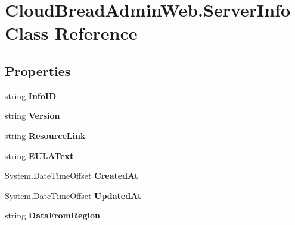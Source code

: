 \hypertarget{a00178}{}\section{Cloud\+Bread\+Admin\+Web.\+Server\+Info Class Reference}
\label{a00178}
\subsection*{Properties}
\begin{DoxyCompactItemize}
\item 
string {\bfseries Info\+ID}\hypertarget{a00178_accdcdfc1ab4e23514b0f8f4c015e8373}{}\label{a00178_accdcdfc1ab4e23514b0f8f4c015e8373}

\item 
string {\bfseries Version}\hypertarget{a00178_ad57bcb8012a019e9b0215ae4ece28b0b}{}\label{a00178_ad57bcb8012a019e9b0215ae4ece28b0b}

\item 
string {\bfseries Resource\+Link}\hypertarget{a00178_ad7a6b91f540b9af762f3ad8f5b28a93e}{}\label{a00178_ad7a6b91f540b9af762f3ad8f5b28a93e}

\item 
string {\bfseries E\+U\+L\+A\+Text}\hypertarget{a00178_a1e5b8106ec76a448170ea297b37dfe59}{}\label{a00178_a1e5b8106ec76a448170ea297b37dfe59}

\item 
System.\+Date\+Time\+Offset {\bfseries Created\+At}\hypertarget{a00178_a49ee6d1cd64f5585dd058feb609a7b0a}{}\label{a00178_a49ee6d1cd64f5585dd058feb609a7b0a}

\item 
System.\+Date\+Time\+Offset {\bfseries Updated\+At}\hypertarget{a00178_a5c9e28702a1aa0fc12aab5b38db2f85c}{}\label{a00178_a5c9e28702a1aa0fc12aab5b38db2f85c}

\item 
string {\bfseries Data\+From\+Region}\hypertarget{a00178_a392128c02d82bc12ace36cfcc12caa8f}{}\label{a00178_a392128c02d82bc12ace36cfcc12caa8f}


\end{DoxyCompactItemize}
